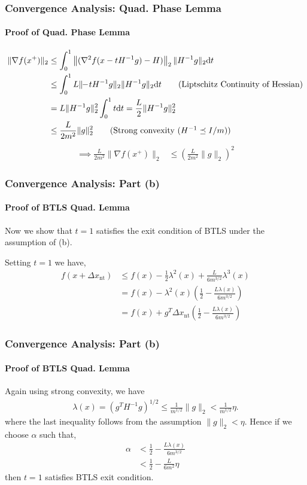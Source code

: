 \documentclass{beamer}
\begin{document}
\begin{frame}
    \frametitle{Convergence Analysis: Quad. Phase Lemma}
    \framesubtitle{Proof of Quad. Phase Lemma}
    \begin{align}
    \| \nabla f(x^{+})\|_2 &\leq \int_{0}^{1} \left\| (\nabla^2 f(x-tH^{-1}g) - H)\right\|_2 \|H^{-1}g\|_2 \mathrm{d}t \notag \\
	&\leq \int_{0}^{1} L \| \!\!-\!tH^{-1}g \|_2 \|H^{-1}g\|_2 \mathrm{d}t \tag{Liptschitz Continuity of Hessian} \\
	&= L \|H^{-1}g\|_2^2 \int_{0}^{1} t \mathrm{d}t = \frac{L}{2} \|H^{-1}g\|_2^2 \notag \\	
	&\leq \frac{L}{2m^2} \|g\|_2^2 \tag{Strong convexity ($H^{-1} \preceq I/m$)}
	\end{align}
	\begin{align}
 	\implies \frac{L}{2m^2} \| \nabla f(x^{+})\|_2 &\leq \left( \frac{L}{2m^2} \|g\|_2 \right)^2
    \end{align}
\end{frame}
\begin{frame}
    \frametitle{Convergence Analysis: Part (b)}
    \framesubtitle{Proof of BTLS Quad. Lemma}
    Now we show that $t = 1$ satisfies the exit condition of BTLS under the
    assumption of (b).

Setting $t=1$ we have,
\begin{align}
    f(x+\Delta x_{\mathrm{nt}}) & \le f(x) - \frac{1}{2} \lambda^2(x) + \frac{L}{6 m^{3/2}} \lambda^3(x)
    \nonumber \\ 
    & = f(x) - \lambda^2(x) \left(\frac{1}{2}  - \frac{L\lambda(x)}{6 m^{3/2}} \right )
    \nonumber \\ 
    & = f(x) + g^T \Delta x_{\mathrm{nt}} \left(\frac{1}{2}  - \frac{L\lambda(x)}{6 m^{3/2}} \right )
\end{align}
\end{frame}
\begin{frame}
    \frametitle{Convergence Analysis: Part (b)}
    \framesubtitle{Proof of BTLS Quad. Lemma}
Again using strong convexity, we have
\begin{align}
\lambda(x) = (g^T H^{-1} g )^{1/2} \le \frac{1}{m^{1/2}} \|g\|_2 < \frac{1}{m^{1/2}} \eta. 
\end{align}
where the last inequality follows from the assumption $\|g\|_2 < \eta $. 
Hence if we choose $\alpha$ such that,
\begin{align}
\alpha & < \frac{1}{2}  - \frac{L\lambda(x)}{6 m^{3/2}}  \nonumber
     \\ 
     & < \frac{1}{2}  - \frac{L}{6 m^{2}}  \eta
\end{align}
then $t=1$ satisfies BTLS exit condition.
\end{frame}
\end{document}
